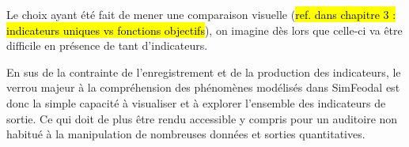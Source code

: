 	Le choix ayant été fait de mener une comparaison visuelle (\hl{ref. dans chapitre 3 : indicateurs uniques vs fonctions objectifs}), on imagine dès lors que celle-ci va être difficile en présence de tant d'indicateurs.

	En sus de la contrainte de l'enregistrement et de la production des indicateurs, le verrou majeur à la compréhension des phénomènes modélisés dans SimFeodal est donc la simple capacité à visualiser et à explorer l'ensemble des indicateurs de sortie.
	Ce qui doit de plus être rendu accessible y compris pour un auditoire non habitué à la manipulation de nombreuses données et sorties quantitatives.
